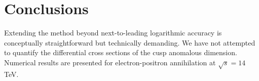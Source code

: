 \section{Conclusions}\label{sec:conclusions}

Extending the method beyond next-to-leading logarithmic accuracy is
conceptually straightforward but technically demanding. We have not
attempted to quantify the differential cross sections of the cusp
anomalous dimension. Numerical results are presented for
electron-positron annihilation at $\sqrt{s} = 14$ TeV.

